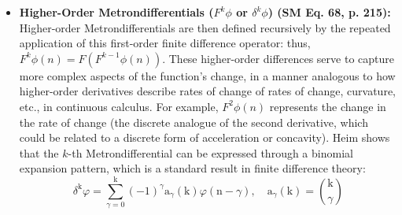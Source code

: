 \documentclass[12pt]{article}
\newcommand{\metrondifferential}{F} %
\newcommand{\metronenziffer}{n}
\begin{document}
\begin{itemize}
    \item \textbf{Higher-Order Metrondifferentials (\( \metrondifferential^k\phi \) or \( \delta^k\phi \)) (SM Eq. 68, p. 215):}
    Higher-order Metrondifferentials are then defined recursively by the repeated application of this first-order finite difference operator: thus, \( \metrondifferential^k\phi(\metronenziffer) = \metrondifferential(\metrondifferential^{k-1}\phi(\metronenziffer)) \). These higher-order differences serve to capture more complex aspects of the function's change, in a manner analogous to how higher-order derivatives describe rates of change of rates of change, curvature, etc., in continuous calculus. For example, \( \metrondifferential^2\phi(\metronenziffer) \) represents the change in the rate of change (the discrete analogue of the second derivative, which could be related to a discrete form of acceleration or concavity). Heim shows that the \( k \)-th Metrondifferential can be expressed through a binomial expansion pattern, which is a standard result in finite difference theory:
    \begin{equation}
    \delta^\mathrm{k}\varphi = \sum_{\gamma=0}^\mathrm{k} (-1)^\gamma \mathrm{a}_\gamma(\mathrm{k})\varphi(\mathrm{n}-\gamma), \quad \mathrm{a}_\gamma(\mathrm{k}) = \binom{\mathrm{k}}{\gamma} \tag{68}
    \label{eq:original_kth_metrondifferential}
    \end{equation}


\end{itemize}
\end{document}
